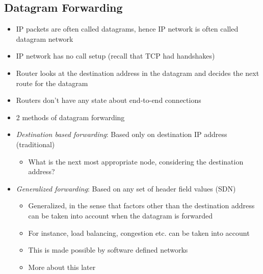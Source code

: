 \subsection{Datagram Forwarding}
\begin{itemize}
	\item IP packets are often called datagrams, hence IP network is often called datagram network
	\item IP network has no call setup (recall that TCP had handshakes)
	\item Router looks at the destination address in the datagram and decides the next route for the datagram
	\item Routers don't have any state about end-to-end connections
	\item 2 methods of datagram forwarding
	\item \textit{Destination based forwarding}: Based only on destination IP address (traditional)
	\begin{itemize}
		\item What is the next most appropriate node, considering the destination address?
	\end{itemize}
	\item \textit{Generalized forwarding}: Based on any set of header field values (SDN)
	\begin{itemize}
		\item Generalized, in the sense that factors other than the destination address can be taken into account when the datagram is forwarded
		\item For instance, load balancing, congestion etc. can be taken into account
		\item This is made possible by software defined networks
		\item More about this later
	\end{itemize}
\end{itemize}


